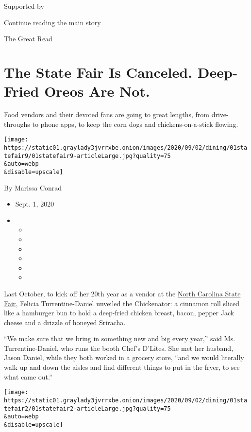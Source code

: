 Supported by

\protect\hyperlink{after-sponsor}{Continue reading the main story}

The Great Read

\hypertarget{the-state-fair-is-canceled-deep-fried-oreos-are-not}{%
\section{The State Fair Is Canceled. Deep-Fried Oreos Are
Not.}\label{the-state-fair-is-canceled-deep-fried-oreos-are-not}}

Food vendors and their devoted fans are going to great lengths, from
drive-throughs to phone apps, to keep the corn dogs and
chickens-on-a-stick flowing.

\texttt{[image: https://static01.graylady3jvrrxbe.onion/images/2020/09/02/dining/01statefair9/01statefair9-articleLarge.jpg?quality=75\\\&auto=webp\\\&disable=upscale]}

By Marissa Conrad

\begin{itemize}
\item
  Sept. 1, 2020
\item
  \begin{itemize}
  \item
  \item
  \item
  \item
  \item
  \item
  \end{itemize}
\end{itemize}

Last October, to kick off her 20th year as a vendor at the
\href{http://www.ncstatefair.org/index.htm}{North Carolina State Fair},
Felicia Turrentine-Daniel unveiled the Chickenator: a cinnamon roll
sliced like a hamburger bun to hold a deep-fried chicken breast, bacon,
pepper Jack cheese and a drizzle of honeyed Sriracha.

``We make sure that we bring in something new and big every year,'' said
Ms. Turrentine-Daniel, who runs the booth Chef's D'Lites. She met her
husband, Jason Daniel, while they both worked in a grocery store, ``and
we would literally walk up and down the aisles and find different things
to put in the fryer, to see what came out.''

\texttt{[image: https://static01.graylady3jvrrxbe.onion/images/2020/09/02/dining/01statefair2/01statefair2-articleLarge.jpg?quality=75\\\&auto=webp\\\&disable=upscale]}

